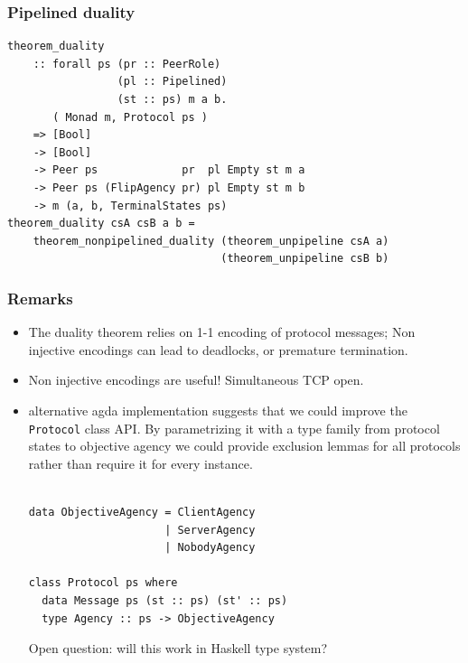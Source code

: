 \documentclass[t,dvipsnames]{beamer}
\begin{document}
\begin{frame}[fragile]
  \frametitle{Pipelined duality}
  \begin{verbatim}
theorem_duality
    :: forall ps (pr :: PeerRole)
                 (pl :: Pipelined)
                 (st :: ps) m a b.
       ( Monad m, Protocol ps )
    => [Bool]
    -> [Bool]
    -> Peer ps             pr  pl Empty st m a
    -> Peer ps (FlipAgency pr) pl Empty st m b
    -> m (a, b, TerminalStates ps)
theorem_duality csA csB a b =
    theorem_nonpipelined_duality (theorem_unpipeline csA a)
                                 (theorem_unpipeline csB b)
  \end{verbatim}
\end{frame}

\begin{frame}[fragile]
  \frametitle{Remarks}
  \begin{itemize}
    \item The duality theorem relies on 1-1 encoding of protocol messages; Non injective encodings can lead to deadlocks, or premature termination.
    \item Non injective encodings are useful!  Simultaneous TCP open.
    \item alternative agda implementation suggests that we could improve the
      \texttt{Protocol} class API.  By parametrizing it with a type family from
      protocol states to objective agency we could provide exclusion lemmas for
      all protocols rather than require it for every instance.
      \begin{verbatim}

data ObjectiveAgency = ClientAgency
                     | ServerAgency
                     | NobodyAgency

class Protocol ps where
  data Message ps (st :: ps) (st' :: ps)
  type Agency :: ps -> ObjectiveAgency
      \end{verbatim}

      Open question: will this work in Haskell type system?
  \end{itemize}
\end{frame}
\end{document}
